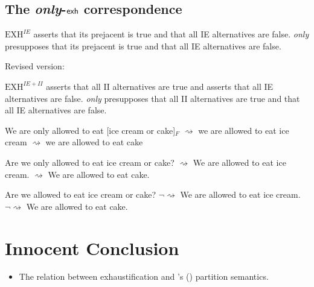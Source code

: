 \documentclass[landscape,cronos,paper=letter]{ling-handout}
\begin{document}
\subsection{The \textit{only}-$\textsf{exh}$ correspondence}

    \pex
\a \(\mathrm{EXH}^{IE}\) \alert{asserts} that its prejacent is true and
that all IE alternatives are false. \a \textit{only} \alert{presupposes}
that its prejacent is true and that all IE alternatives are false. \xe

Revised version:

\pex
\a \(\mathrm{EXH}^{IE+II}\) \alert{asserts} that all II alternatives are
true and asserts that all IE alternatives are false. \a \textit{only}
\alert{presupposes} that all II alternatives are true and that all IE
alternatives are false. \xe

\pex
We are only allowed to eat {[}ice cream or cake{]}\(_F\) \a \(⇝\) we are
allowed to eat ice cream \a \(⇝\) we are allowed to eat cake \xe

\pex
Are we only allowed to eat ice cream or cake? \a \(⇝\) We are allowed to
eat ice cream. \a \(⇝\) We are allowed to eat cake. \xe

\pex
Are we allowed to eat ice cream or cake? \a \(¬⇝\) We are allowed to eat
ice cream. \a \(¬⇝\) We are allowed to eat cake. \xe


\section{Innocent Conclusion}

\begin{itemize}

    \item The relation between exhaustification and \citeauthor{groenendijk_studies_1984}'s (\citeyear{groenendijk_studies_1984}) partition semantics.

\end{itemize}



\printbibliography
\end{document}
